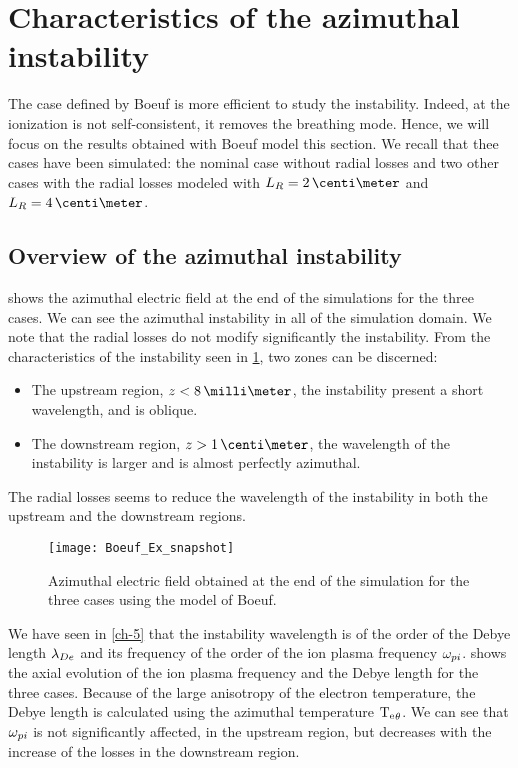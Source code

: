 
\section{Characteristics of the azimuthal instability}


The case defined by Boeuf is more efficient to  study the instability.
Indeed, at the ionization is not self-consistent, it removes the breathing mode.
Hence, we will focus on the results obtained with Boeuf model this section.
We recall that thee cases have been simulated\string: the nominal case without radial losses and two other cases with the radial losses modeled with $L_R=2\,\centi\meter$ and $L_R=4\,\centi\meter$.

\subsection{Overview of the azimuthal instability} \label{subsec-azi_insta_Ztheta}
 shows the azimuthal electric field at the end of the simulations for the three cases.
We can see the azimuthal instability in all of the simulation domain.
We note that the radial losses do not modify significantly the instability.
From the characteristics of the instability seen in \cref{fig-snapshots}, two zones can be discerned\string:
\begin{itemize}
  \item The upstream region, $z < 8 \,\milli\meter$, the instability present a short wavelength, and is oblique.
  \item The downstream region, $z > 1\,\centi\meter$, the wavelength of the instability is larger and is almost perfectly azimuthal.
\end{itemize}
The radial losses seems to reduce the wavelength of the instability in both the upstream and the downstream regions.


\begin{figure}[hbtp]
  \centering
  \texttt{[image: Boeuf\_Ex\_snapshot]}
  \caption{Azimuthal electric field obtained at the end of the simulation for the three cases using the model of Boeuf.}
  \label{fig-snapshots}
\end{figure}

We have seen in \cref{ch-5} that the instability wavelength is of the order of the Debye length $\lambda_{De}$ and its frequency of the order of the ion plasma frequency $\omega_{pi}$.
 shows the axial evolution of the ion plasma frequency and the Debye length for the three cases.
Because of the large anisotropy of the electron temperature, the Debye length is calculated using the azimuthal temperature $\mathrm{T_e}_{\theta}$.
We can see that $\omega_{pi}$ is not significantly affected, in the upstream region, but decreases with the increase of the losses in the downstream region.

